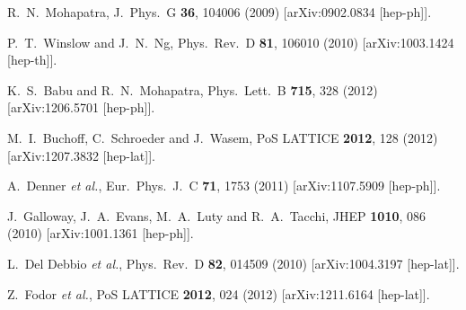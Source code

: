 \begin{thebibliography}{99}
  R.~N.~Mohapatra,
  J.\ Phys.\ G {\bf 36}, 104006 (2009)
  [arXiv:0902.0834 [hep-ph]].

  P.~T.~Winslow and J.~N.~Ng,
  Phys.\ Rev.\ D {\bf 81}, 106010 (2010)
  [arXiv:1003.1424 [hep-th]].

  K.~S.~Babu and R.~N.~Mohapatra,
  Phys.\ Lett.\ B {\bf 715}, 328 (2012)
  [arXiv:1206.5701 [hep-ph]].

  M.~I.~Buchoff, C.~Schroeder and J.~Wasem,
  PoS LATTICE {\bf 2012}, 128 (2012)
  [arXiv:1207.3832 [hep-lat]].
  
  
  A.~Denner {\it et al.},
  Eur.\ Phys.\ J.\ C {\bf 71}, 1753 (2011)
  [arXiv:1107.5909 [hep-ph]].
  
  J.~Galloway, J.~A.~Evans, M.~A.~Luty and R.~A.~Tacchi,
  JHEP {\bf 1010}, 086 (2010)
  [arXiv:1001.1361 [hep-ph]].
  
  L.~Del Debbio {\it et al.},
  Phys.\ Rev.\ D {\bf 82}, 014509 (2010)
  [arXiv:1004.3197 [hep-lat]].
  
  Z.~Fodor {\it et al.},
  PoS LATTICE {\bf 2012}, 024 (2012)
  [arXiv:1211.6164 [hep-lat]].


\end{thebibliography}
